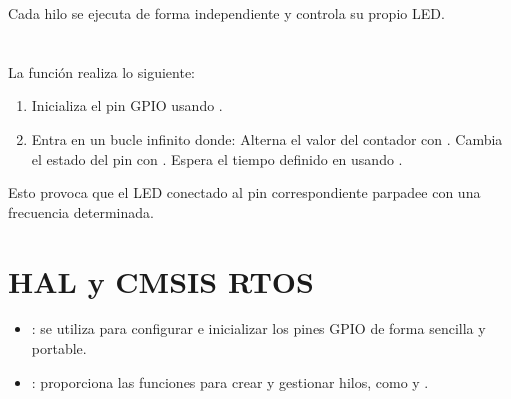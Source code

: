 \documentclass[letterpaper,10pt,english]{sphinxmanual}
\begin{document}
\sphinxAtStartPar
Cada hilo se ejecuta de forma independiente y controla su propio LED.


\section{}
\label{\detokenize{ejemplothreads:thread}}
\sphinxAtStartPar
La función  realiza lo siguiente:
\begin{enumerate}
%
\item {} 
\sphinxAtStartPar
Inicializa el pin GPIO usando .

\item {} 
\sphinxAtStartPar
Entra en un bucle infinito donde:
\sphinxhyphen{} Alterna el valor del contador con .
\sphinxhyphen{} Cambia el estado del pin con .
\sphinxhyphen{} Espera el tiempo definido en  usando .

\end{enumerate}

\sphinxAtStartPar
Esto provoca que el LED conectado al pin correspondiente parpadee con una frecuencia determinada.


\section{HAL y CMSIS RTOS}
\label{\detokenize{ejemplothreads:hal-y-cmsis-rtos}}\begin{itemize}
\item {} 
\sphinxAtStartPar
{}: se utiliza para configurar e inicializar los pines GPIO de forma sencilla y portable.

\item {} 
\sphinxAtStartPar
{}: proporciona las funciones para crear y gestionar hilos, como  y .

\end{itemize}
\end{document}
